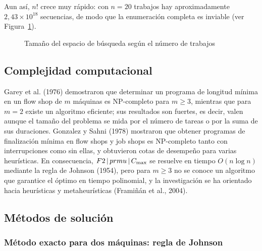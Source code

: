 Aun así, $n!$ crece muy rápido: con $n=20$ trabajos hay aproximadamente
$2{,}43\times 10^{18}$ secuencias, de modo que la enumeración completa es inviable
(ver Figura~\ref{fig:espacio}).

\begin{figure}[htbp]
\caption{Tamaño del espacio de búsqueda según el número de trabajos}\label{fig:espacio}
\centering
{}
\end{figure}

\subsection{Complejidad computacional}

Garey et al. (1976) demostraron que determinar un programa de longitud mínima en un flow
shop de $m$ máquinas es NP-completo para $m\ge 3$, mientras que para $m=2$ existe un
algoritmo eficiente; sus resultados son fuertes, es decir, valen aunque el tamaño del
problema se mida por el número de tareas o por la suma de sus duraciones. Gonzalez y Sahni
(1978) mostraron que obtener programas de finalización mínima en flow shops y job shops
es NP-completo tanto con interrupciones como sin ellas, y obtuvieron cotas de desempeño
para varias heurísticas. En consecuencia, $F2\,|\,prmu\,|\,C_{\max}$ se resuelve en tiempo
$O(n\log n)$ mediante la regla de Johnson (1954), pero para $m\ge 3$ no se conoce un
algoritmo que garantice el óptimo en tiempo polinomial, y la investigación se ha
orientado hacia heurísticas y metaheurísticas (Framiñán et al., 2004).

\subsection{Métodos de solución}

\subsubsection{Método exacto para dos máquinas: regla de Johnson}

